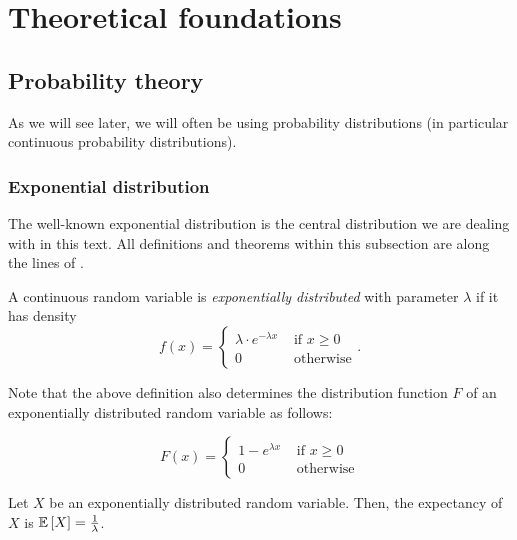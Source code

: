 \chapter{Theoretical foundations}
\label{chap:theoretical-foundations}

\section{Probability theory}
\label{sec:some-probability}

As we will see later, we will often be using probability distributions (in particular continuous probability distributions).

\subsection{Exponential distribution}
\label{sec:exponential-distribution}

The well-known exponential distribution is the central distribution we are dealing with in this text. All definitions and theorems within this subsection are along the lines of \cite{schickinger2001diskrete}.

\begin{definition}
  A continuous random variable is \emph{exponentially distributed} with parameter $\lambda$ if it has density 
  \begin{equation*}
    f(x) =
    \begin{cases}
      \lambda \cdot e^{-\lambda x} & \text{ if } x \geq 0 
      \\ 0 & \text{ otherwise}
    \end{cases}
    .
  \end{equation*}
\end{definition}

Note that the above definition also determines the distribution function $F$ of an exponentially distributed random variable as follows:

\begin{equation*}
  F(x) =
  \begin{cases}
    1-e^{\lambda x} & \text{ if } x \geq 0 \\
    0 & \text{ otherwise}
  \end{cases}
\end{equation*}

\begin{theorem}
  \label{thm:exponential-distribution-expectancy}
  Let $X$ be an exponentially distributed random variable. Then, the expectancy of $X$ is $\mathbb{E}\left[ X \right] = \frac 1 \lambda$.
\end{theorem}

